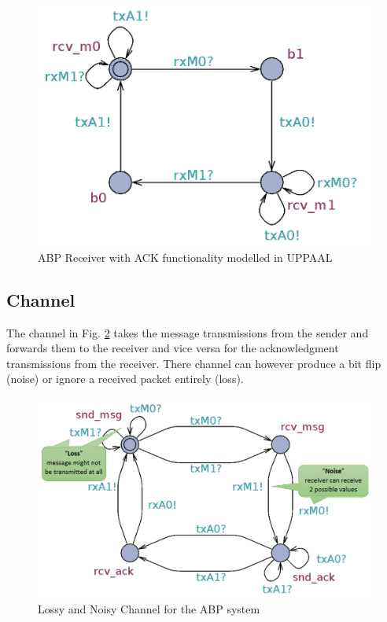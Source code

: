 \documentclass[10pt,bibliography=totocnumbered,listof=totocnumbered, footsepline, headsepline]{scrreprt}
\begin{document}
\begin{figure}[H]
	\centerline{\includegraphics[width=28pc]{uppaal_rx.png}}
	\caption{ABP Receiver with ACK functionality modelled in UPPAAL}
	\label{fig:uppaal_rx}
\end{figure}

\subsection{Channel}

The channel in Fig. \ref{fig:uppaal_channel} takes the message transmissions from the sender and forwards them to the receiver and vice versa for the acknowledgment transmissions from the receiver.
There channel can however produce a bit flip (noise) or ignore a received packet entirely (loss).

\begin{figure}[H]
	\centerline{\includegraphics[width=38pc]{uppaal_channel.png}}
	\caption{Lossy and Noisy Channel for the ABP system}
	\label{fig:uppaal_channel}
\end{figure}
\end{document}
